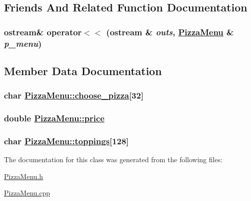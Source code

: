 \subsection{Friends And Related Function Documentation}
\hypertarget{class_pizza_menu_09ec739bea659a73825966761529e5d7}{
\subsubsection[operator$<$$<$]{\setlength{\rightskip}{0pt plus 5cm}ostream\& operator$<$$<$ (ostream \& {\em outs}, \hyperlink{class_pizza_menu}{Pizza\-Menu} \& {\em p\_\-menu})}}
\label{class_pizza_menu_09ec739bea659a73825966761529e5d7}




\subsection{Member Data Documentation}
\hypertarget{class_pizza_menu_04a00e7cbd548718d71a7c6afccae12f}{
\subsubsection[choose\_\-pizza]{\setlength{\rightskip}{0pt plus 5cm}char \hyperlink{class_pizza_menu_04a00e7cbd548718d71a7c6afccae12f}{Pizza\-Menu::choose\_\-pizza}\mbox{[}32\mbox{]}}}
\label{class_pizza_menu_04a00e7cbd548718d71a7c6afccae12f}


\hypertarget{class_pizza_menu_78a5eb43deef9a7b5b9ce157b9d52ac4}{
\subsubsection[price]{\setlength{\rightskip}{0pt plus 5cm}double \hyperlink{class_pizza_menu_78a5eb43deef9a7b5b9ce157b9d52ac4}{Pizza\-Menu::price}}}
\label{class_pizza_menu_78a5eb43deef9a7b5b9ce157b9d52ac4}


\hypertarget{class_pizza_menu_b4f1e053cb69bc112e31a52a18d64dbd}{
\subsubsection[toppings]{\setlength{\rightskip}{0pt plus 5cm}char \hyperlink{class_pizza_menu_b4f1e053cb69bc112e31a52a18d64dbd}{Pizza\-Menu::toppings}\mbox{[}128\mbox{]}}}
\label{class_pizza_menu_b4f1e053cb69bc112e31a52a18d64dbd}




The documentation for this class was generated from the following files:\begin{CompactItemize}
\item 
\hyperlink{_pizza_menu_8h}{Pizza\-Menu.h}\item 
\hyperlink{_pizza_menu_8cpp}{Pizza\-Menu.cpp}\end{CompactItemize}
